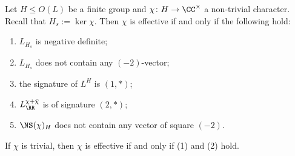 \begin{proposition}\label{iseffective}
Let $H\leq O(L)$ be a finite group and $\chi \colon H \to \CC^\times$ a non-trivial character. Recall that $H_s := \ker \chi$. Then $\chi$ is effective if and only if the following hold:
\begin{enumerate}
 \item $L_{H_s}$ is negative definite;
 \item $L_{H_s}$ does not contain any $(-2)$-vector;
 \item the signature of $L^H$ is $(1,*)$;
 \item $L_\RR^{\chi+\bar \chi}$ is of signature $(2,*)$;
 \item $\NS(\chi)_H$ does not contain any vector of square $(-2)$.
 \end{enumerate}
If $\chi$ is trivial, then $\chi$ is effective if and only if (1) and (2) hold.
\end{proposition}
